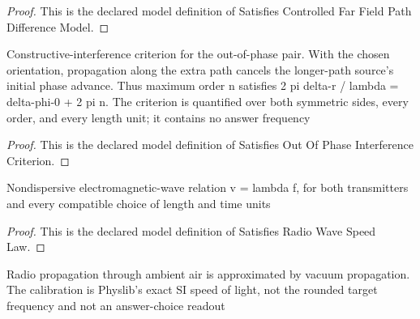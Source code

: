 \begin{proof}
  This is the declared model definition of Satisfies Controlled Far Field Path Difference Model.
\end{proof}
\begin{definition}
  \label{def:physics:phyx-mini-0247:phyxminiproblems-problemphyxmini0247-satisfiesoutofphaseinterferencecriterion}
  Constructive-interference criterion for the out-of-phase pair. With the chosen orientation, propagation along the extra path cancels the longer-path source's initial phase advance. Thus maximum order n satisfies 2 pi delta-r / lambda = delta-phi-0 + 2 pi n. The criterion is quantified over both symmetric sides, every order, and every length unit; it contains no answer frequency
\end{definition}
\begin{proof}
  This is the declared model definition of Satisfies Out Of Phase Interference Criterion.
\end{proof}
\begin{definition}
  \label{def:physics:phyx-mini-0247:phyxminiproblems-problemphyxmini0247-satisfiesradiowavespeedlaw}
  Nondispersive electromagnetic-wave relation v = lambda f, for both transmitters and every compatible choice of length and time units
\end{definition}
\begin{proof}
  This is the declared model definition of Satisfies Radio Wave Speed Law.
\end{proof}
\begin{definition}
  \label{def:physics:phyx-mini-0247:phyxminiproblems-problemphyxmini0247-usesambientairvacuumpropagation}
  Radio propagation through ambient air is approximated by vacuum propagation. The calibration is Physlib's exact SI speed of light, not the rounded target frequency and not an answer-choice readout
\end{definition}
